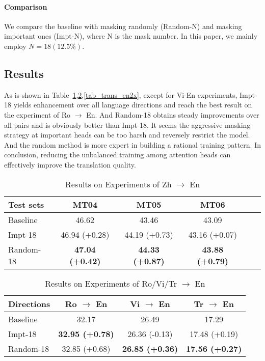 \documentclass[11pt]{article}
\begin{document}
\paragraph{Comparison} We compare the baseline with masking randomly (Random-N) and masking important ones (Impt-N), where N is the mask number. In this paper, we mainly employ $N=18 (12.5\%)$.




\subsection{Results} 
As is shown in Table~\ref{tab_trans_zh2en},\ref{tab_trans_x2en},\ref{tab_trans_en2x}, except for Vi-En experiments, Impt-18 yields enhancement over all language directions and reach the best result on the experiment of Ro $\rightarrow$ En. And Random-18 obtains steady improvements over all pairs and is obviously better than Impt-18. It seems the aggressive masking strategy at important heads can be too harsh and reversely restrict the model. And the random method is more expert in building a rational training pattern. In conclusion, reducing the unbalanced training among attention heads can effectively improve the translation quality.

\begin{table}[h]\footnotesize
    \centering
    \begin{tabular}{lccccc}
        \hline
        Test sets & MT04 & MT05 & MT06 \\ \hline
        Baseline & 46.62 & 43.46 & 43.09 \\
        Impt-18 & 46.94 (+0.28) & 44.19 (+0.73) & 43.16 (+0.07) \\
Random-18 & \textbf{47.04 (+0.42)} & \textbf{44.33 (+0.87)} & \textbf{43.88 (+0.79)} \\ \hline
\end{tabular}
    \caption{Results on Experiments of Zh $\rightarrow$ En}
    \label{tab_trans_zh2en}
\end{table}

\begin{table}[h]\footnotesize
    \centering
    \begin{tabular}{lccc}
        \hline
        Directions & Ro $\rightarrow$ En & Vi $\rightarrow$ En  & Tr $\rightarrow$ En \\ \hline
        Baseline & 32.17 & 26.49 & 17.29 \\
Impt-18 & \textbf{32.95 (+0.78)} & 26.36 (-0.13) & 17.48 (+0.19) \\
        Random-18 & 32.85 (+0.68) & \textbf{26.85 (+0.36)} & \textbf{17.56 (+0.27)} \\ \hline
\end{tabular}
    \caption{Results on Experiments of Ro/Vi/Tr $\rightarrow$ En}
    \label{tab_trans_x2en}
\end{table}
\end{document}
